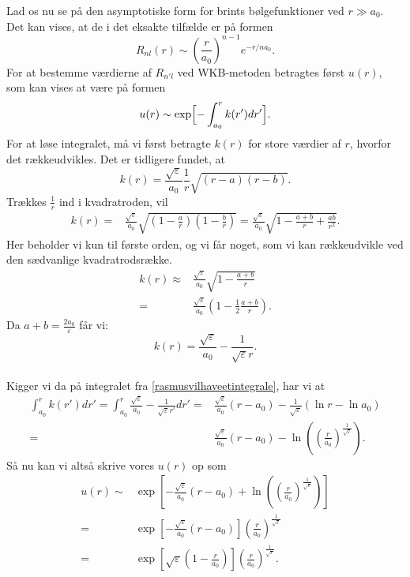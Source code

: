 Lad os nu se på den asymptotiske form for brints bølgefunktioner ved $r\gg a_0$. Det kan vises, at de i det eksakte tilfælde er på formen
\begin{equation}
    R_{nl}(r) \sim \left(\frac{r}{a_0}\right)^{n-1}e^{-r/na_0}.
  \label{eq:eksaktR}
\end{equation}
%
For at bestemme værdierne af $R_{n'l}$ ved WKB-metoden betragtes først $u(r)$, som kan vises at være på formen
\begin{equation}
    u(r) \sim \exp\Bigl[-\int_{a_0}^{r}k(r')dr'\Bigr].
    \label{rasmusvilhaveetintegrale}
\end{equation}
For at løse integralet, må vi først betragte $k(r)$ for store værdier af $r$, hvorfor det rækkeudvikles. Det er tidligere fundet, at
\begin{equation}
    k(r) = \frac{\sqrt{\varepsilon}}{a_0}\frac{1}{r}\sqrt{(r-a)(r-b)}.
\end{equation}
Trækkes $\frac{1}{r}$ ind i kvadratroden, vil
\begin{align}
    k(r) = & \frac{\sqrt{\varepsilon}}{a_0}\sqrt{(1-\frac{a}{r})(1-\frac{b}{r})} = \frac{\sqrt{\varepsilon}}{a_0}\sqrt{1-\frac{a+b}{r}+\frac{ab}{r^2}}.
\end{align}
Her beholder vi kun til første orden, og vi får noget, som vi kan rækkeudvikle ved den sædvanlige kvadratrodsrække.
\begin{align}
  k(r) \approx & \frac{\sqrt{\varepsilon}}{a_0}\sqrt{1-\frac{a+b}{r}}\\
  = & \frac{\sqrt{\varepsilon}}{a_0}\left(1-\frac{1}{2}\frac{a+b}{r}\right).
\end{align}
Da $a+b = \frac{2a_0}{\varepsilon}$ får vi:
\begin{equation}
  k(r) = \frac{\sqrt{\varepsilon}}{a_0}-\frac{1}{\sqrt{\varepsilon}r}.
\end{equation}
\\
Kigger vi da på integralet fra \cref{rasmusvilhaveetintegrale}, har vi at
\begin{align}
    \int_{a_0}^{r}k(r')dr' = \int_{a_0}^{r} \frac{\sqrt{\varepsilon}}{a_0}-\frac{1}{\sqrt{\varepsilon}r'} dr'= 
& \frac{\sqrt{\varepsilon}}{a_0}(r-a_0) - \frac{1}{\sqrt{\varepsilon}}\left(\ln{r}-\ln{a_0}\right)\\
= & \frac{\sqrt{\varepsilon}}{a_0}(r-a_0) - \ln{((\frac{r}{a_0})^{\frac{1}{\sqrt{\varepsilon}}})}.
\end{align}
%
Så nu kan vi altså skrive vores $u(r)$ op som
\begin{align}
  u(r) \sim & \exp\left[-\frac{\sqrt{\varepsilon}}{a_0}(r-a_0) + \ln{((\frac{r}{a_0})^{\frac{1}{\sqrt{\varepsilon}}})}\right]\\
        = & \exp\left[-\frac{\sqrt{\varepsilon}}{a_0}(r-a_0)\right] {\left(\frac{r}{a_0}\right)}^{\frac{1}{\sqrt{\varepsilon}}}\\
        = & \exp\left[\sqrt{\varepsilon}(1-\frac{r}{a_0})\right] {\left(\frac{r}{a_0}\right)}^{\frac{1}{\sqrt{\varepsilon}}}.
\end{align}
